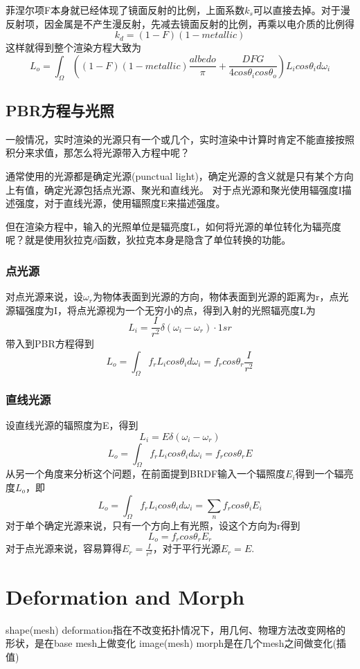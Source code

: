 菲涅尔项F本身就已经体现了镜面反射的比例，上面系数$k_{s}$可以直接去掉。对于漫反射项，因金属是不产生漫反射，先减去镜面反射的比例，再乘以电介质的比例得
$$
k_{d}=(1 - F)(1 - metallic)
$$
这样就得到整个渲染方程大致为
$$
L_{o}=\int_{\Omega}((1 - F)(1 - metallic)\frac{albedo}{\pi} + \frac{DFG}{4cos{\theta}_{i}cos{\theta}_{o}})L_{i}cos{\theta}_{i}d{\omega}_{i}
$$

\section{PBR方程与光照}
一般情况，实时渲染的光源只有一个或几个，实时渲染中计算时肯定不能直接按照积分来求值，那怎么将光源带入方程中呢？

通常使用的光源都是确定光源(punctual light)，确定光源的含义就是只有某个方向上有值，确定光源包括点光源、聚光和直线光。
对于点光源和聚光使用辐强度I描述强度，对于直线光源，使用辐照度E来描述强度。

但在渲染方程中，输入的光照单位是辐亮度L，如何将光源的单位转化为辐亮度呢？就是使用狄拉克$\delta$函数，狄拉克本身是隐含了单位转换的功能。

\subsection{点光源}
对点光源来说，设${\omega}_{r}$为物体表面到光源的方向，物体表面到光源的距离为r，点光源辐强度为I，将点光源视为一个无穷小的点，得到入射的光照辐亮度L为
$$
L_{i}=\frac{I}{r^2}{\delta}({\omega}_{i} - {\omega}_{r}) \cdot 1sr 
$$
带入到PBR方程得到
$$
L_{o}=\int_{\Omega}f_{r}L_{i}cos{\theta}_{i}d{\omega}_{i}=f_{r}cos{\theta}_{r}\frac{I}{r^2}
$$

\subsection{直线光源}
设直线光源的辐照度为E，得到
$$
L_{i}=E{\delta}({\omega}_{i} - {\omega}_{r})
$$
$$
L_{o}=\int_{\Omega}f_{r}L_{i}cos{\theta}_{i}d{\omega}_{i}=f_{r}cos{\theta}_{r}E
$$
从另一个角度来分析这个问题，在前面提到BRDF输入一个辐照度$E_{i}$得到一个辐亮度$L_{o}$，即
$$
L_{o}=\int_{\Omega}f_{r}L_{i}cos{\theta}_{i}d{\omega}_{i}=\sum_{n}f_{r}cos{\theta}_{i}E_{i}
$$
对于单个确定光源来说，只有一个方向上有光照，设这个方向为r得到
$$
L_{o}=f_{r}cos{\theta}_{r}E_{r}
$$
对于点光源来说，容易算得$E_{r}=\frac{I}{r^2}$，对于平行光源$E_{r}=E$.

\chapter{Deformation and Morph}

shape(mesh) deformation指在不改变拓扑情况下，用几何、物理方法改变网格的形状，是在base mesh上做变化
image(mesh) morph是在几个mesh之间做变化(插值)